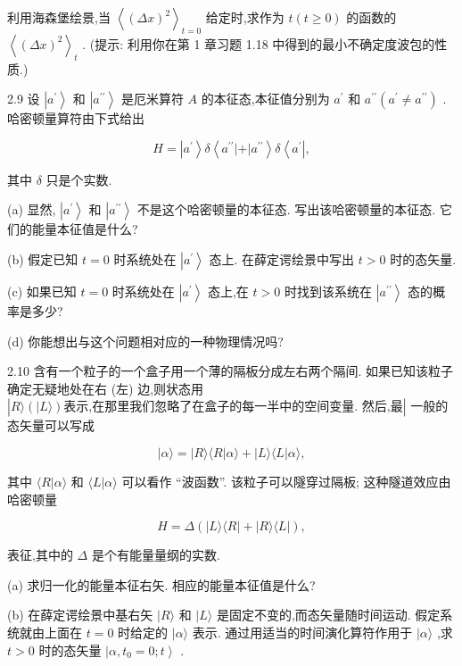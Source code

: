 利用海森堡绘景,当 ${\left\langle {\left( \Delta x\right) }^{2}\right\rangle }_{t = 0}$ 给定时,求作为 $t\left( {t \geq 0}\right)$ 的函数的 ${\left\langle {\left( \Delta x\right) }^{2}\right\rangle }_{t}$ . (提示: 利用你在第 1 章习题 1.18 中得到的最小不确定度波包的性质.)

2.9 设 $\left| {a}^{\prime }\right\rangle$ 和 $\left| {a}^{\prime \prime }\right\rangle$ 是厄米算符 $A$ 的本征态,本征值分别为 ${a}^{\prime }$ 和 ${a}^{\prime \prime }\left( {{a}^{\prime } \neq {a}^{\prime \prime }}\right)$ . 哈密顿量算符由下式给出

$$
H = \left| {a}^{\prime }\right\rangle \delta \left\langle {{a}^{\prime \prime }\left| +\right| {a}^{\prime \prime }}\right\rangle \delta \left\langle {a}^{\prime }\right| ,
$$

其中 $\delta$ 只是个实数.

(a) 显然, $\left| {a}^{\prime }\right\rangle$ 和 $\left| {a}^{\prime \prime }\right\rangle$ 不是这个哈密顿量的本征态. 写出该哈密顿量的本征态. 它们的能量本征值是什么?

(b) 假定已知 $t = 0$ 时系统处在 $\left| {a}^{\prime }\right\rangle$ 态上. 在薛定谔绘景中写出 $t > 0$ 时的态矢量.

(c) 如果已知 $t = 0$ 时系统处在 $\left| {a}^{\prime }\right\rangle$ 态上,在 $t > 0$ 时找到该系统在 $\left| {a}^{\prime \prime }\right\rangle$ 态的概率是多少?

(d) 你能想出与这个问题相对应的一种物理情况吗?

2.10 含有一个粒子的一个盒子用一个薄的隔板分成左右两个隔间. 如果已知该粒子确定无疑地处在右 (左) 边,则状态用 $\left| {R\rangle \left( {|L\rangle }\right) \text{表示,在那里我们忽略了在盒子的每一半中的空间变量. 然后,最}}\right|$ 一般的态矢量可以写成

$$
\left| {\alpha \rangle = }\right| R\rangle \langle R | \alpha \rangle + | L\rangle \langle L | \alpha \rangle ,
$$

其中 $\langle R | \alpha \rangle$ 和 $\langle L | \alpha \rangle$ 可以看作 “波函数”. 该粒子可以隧穿过隔板; 这种隧道效应由哈密顿量

$$
H = \Delta \left( {\left| {L\rangle \langle R}\right| + \left| {R\rangle \langle L}\right| }\right) ,
$$

表征,其中的 $\Delta$ 是个有能量量纲的实数.

(a) 求归一化的能量本征右矢. 相应的能量本征值是什么?

(b) 在薛定谔绘景中基右矢 $|R\rangle$ 和 $|L\rangle$ 是固定不变的,而态矢量随时间运动. 假定系统就由上面在 $t = 0$ 时给定的 $|\alpha \rangle$ 表示. 通过用适当的时间演化算符作用于 $|\alpha \rangle$ ,求 $t > 0$ 时的态矢量 $\left| {\alpha ,{t}_{0} = 0;t}\right\rangle$ .


